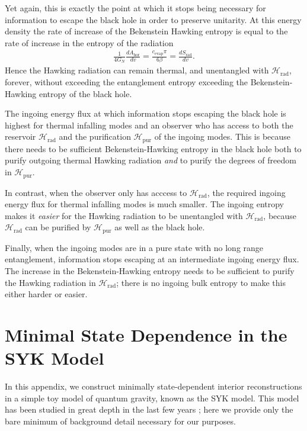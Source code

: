 \documentclass[11pt,a4paper]{article}
\newcommand{\Srad}{S_\text{rad} }
\begin{document}
Yet again, this is exactly the point at which it stops being necessary for information to escape the black hole in order to preserve unitarity. At this energy density the rate of increase of the Bekenstein Hawking entropy is equal to the rate of increase in the entropy of the radiation
\begin{align} \label{eq:T'entropyincrease}
\frac{1}{4 G_N} \frac{d A_\text{hor}}{d v} = \frac{c_\text{evap} \pi}{6 \beta} = \frac{d \Srad}{d v}.
\end{align}
Hence the Hawking radiation can remain thermal, and unentangled with $\mathcal{H}_\text{rad}$, forever, without exceeding the entanglement entropy exceeding the Bekenstein-Hawking entropy of the black hole. 

The ingoing energy flux at which information stops escaping the black hole is highest for thermal infalling modes and an observer who has access to both the reservoir $\mathcal{H}_\text{rad}$ and the purification $\mathcal{H}_\text{pur}$ of the ingoing modes. This is because there needs to be sufficient Bekenstein-Hawking entropy in the black hole both to purify outgoing thermal Hawking radiation \emph{and} to purify the degrees of freedom in $\mathcal{H}_\text{pur}$.

In contrast, when the observer only has acccess to $\mathcal{H}_\text{rad}$, the required ingoing energy flux for thermal infalling modes is much smaller. The ingoing entropy makes it \emph{easier} for the Hawking radiation to be unentangled with $\mathcal{H}_\text{rad}$, because $\mathcal{H}_\text{rad}$ can be purified by $\mathcal{H}_\text{pur}$ as well as the black hole.

Finally, when the ingoing modes are in a pure state with no long range entanglement, information stops escaping at an intermediate ingoing energy flux. The increase in the Bekenstein-Hawking entropy needs to be sufficient to purify the Hawking radiation in $\mathcal{H}_\text{rad}$; there is no ingoing bulk entropy to make this either harder or easier.

\section{Minimal State Dependence in the SYK Model} \label{app:syk}
In this appendix, we construct minimally state-dependent interior reconstructions in a simple toy model of quantum gravity, known as the SYK model. This model has been studied in great depth in the last few years \cite{sachdev1993gapless, kitaev2015simple, maldacena2016remarks, polchinski2016spectrum, cotler2017black, saad2018semiclassical}; here we provide only the bare minimum of background detail necessary for our purposes. 
\end{document}
